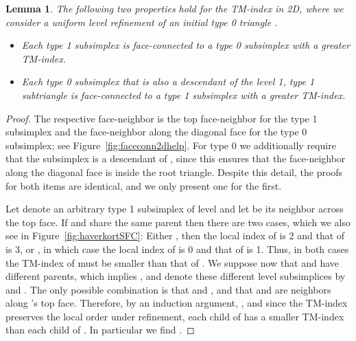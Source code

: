 \documentclass[a4paper,11pt]{article}
\newtheorem{lem}[thm]{Lemma}
\begin{document}
\begin{lem}
  \label{lem:faceconn2dhelp}
  The following two properties hold for the TM-index in 2D, where we consider a
  uniform level  refinement of an initial type 0 triangle .
  \begin{itemize}
    \item Each type 1 subsimplex is face-connected to a type 0
      subsimplex with a greater TM-index.
    \item Each type 0 subsimplex that is also a descendant of the level 1,
      type 1 subtriangle 
      is face-connected to a type 1 subsimplex with a greater TM-index.
  \end{itemize}
\end{lem}
\begin{proof}
  The respective face-neighbor is the top face-neighbor for the type 1 subsimplex
  and the face-neighbor along the diagonal face for the type 0 subsimplex;
  see Figure~\ref{fig:faceconn2dhelp}.
  For type 0 we additionally require that the subsimplex is
  a descendant of , since this ensures that the face-neighbor along the
  diagonal face is inside the root triangle.
  Despite this detail, the proofs for both items are identical, and we only
  present one for the first.

  Let  denote an arbitrary type 1 subsimplex of level  and let  be
  its neighbor across the top face.
  If  and  share the same parent  then there are two cases,
  which we also see in Figure~\ref{fig:haverkortSFC}:
  Either , then the local index of  is 2 and that of  is
  3, or , in which case the local index of  is 0 and that
  of  is 1.
  Thus, in both cases the TM-index of  must be smaller than that of .
  We suppose now that  and  have different parents, which implies
  , and denote these different level  subsimplices by  and
  .
  The only possible combination is that  and , and
  that  and 
  are neighbors along 's top face. Therefore, by an induction argument,
  ,
  and since the TM-index preserves the local order under refinement, each child
  of  has a
  smaller TM-index than each child of .
  In particular we find .
\end{proof}
\end{document}
